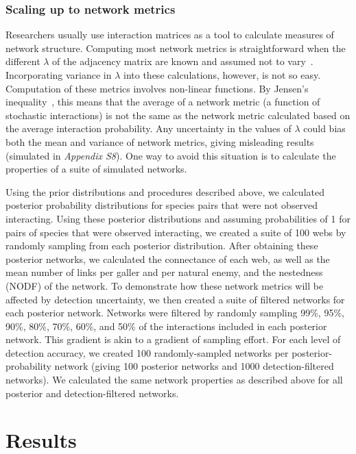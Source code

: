 \documentclass[12pt]{article}
\begin{document}
\begin{spacing}{2.0}
    \subsubsection*{Scaling up to network metrics}

      Researchers usually use interaction matrices as a tool to calculate measures of network structure. Computing most network metrics is straightforward when the different $\lambda$ of the adjacency matrix are known and assumed not to vary~\citep{Poisot2016}. Incorporating variance in $\lambda$ into these calculations, however, is not so easy. Computation of these metrics involves non-linear functions. By Jensen's inequality~\citep{Jensen1906}, this means that the average of a network metric (a function of stochastic interactions) is not the same as the network metric calculated based on the average interaction probability. Any uncertainty in the values of $\lambda$ could bias both the mean and variance of network metrics, giving misleading results (simulated in \emph{Appendix S8}). One way to avoid this situation is to calculate the properties of a suite of simulated networks.


      Using the prior distributions and procedures described above, we calculated posterior probability distributions for species pairs that were not observed interacting. Using these posterior distributions and assuming probabilities of 1 for pairs of species that were observed interacting, we created a suite of 100 webs by randomly sampling from each posterior distribution. After obtaining these posterior networks, we calculated the connectance of each web, as well as the mean number of links per galler and per natural enemy, and the nestedness (NODF) of the network. To demonstrate how these network metrics will be affected by detection uncertainty, we then created a suite of filtered networks for each posterior network. Networks were filtered by randomly sampling 99\%, 95\%, 90\%, 80\%, 70\%, 60\%, and 50\% of the interactions included in each posterior network. This gradient is akin to a gradient of sampling effort. For each level of detection accuracy, we created 100 randomly-sampled networks per posterior-probability network (giving 100 posterior networks and 1000 detection-filtered networks). We calculated the same network properties as described above for all posterior and detection-filtered networks.


\section*{Results}


\end{spacing}
\end{document}
